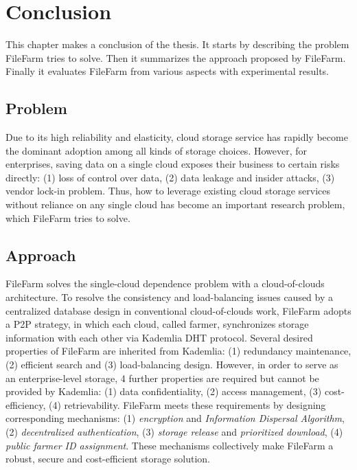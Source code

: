 \chapter{Conclusion}
\label{c:conclusion}

This chapter makes a conclusion of the thesis. It starts by describing the problem FileFarm tries to solve. Then it summarizes the approach proposed by FileFarm. Finally it evaluates FileFarm from various aspects with experimental results.

\section{Problem}
\label{s:conclusionproblem}

Due to its high reliability and elasticity, cloud storage service has rapidly become the dominant adoption among all kinds of storage choices. However, for enterprises, saving data on a single cloud exposes their business to certain risks directly: (1) loss of control over data, (2) data leakage and insider attacks, (3) vendor lock-in problem. Thus, how to leverage existing cloud storage services without reliance on any single cloud has become an important research problem, which FileFarm tries to solve.

\section{Approach}
\label{s:conclusionapproach}

FileFarm solves the single-cloud dependence problem with a cloud-of-clouds architecture. To resolve the consistency and load-balancing issues caused by a centralized database design in conventional cloud-of-clouds work, FileFarm adopts a P2P strategy, in which each cloud, called farmer, synchronizes storage information with each other via Kademlia DHT protocol. Several desired properties of FileFarm are inherited from Kademlia: (1) redundancy maintenance, (2) efficient search and (3) load-balancing design. However, in order to serve as an enterprise-level storage, 4 further properties are required but cannot be provided by Kademlia: (1) data confidentiality, (2) access management, (3) cost-efficiency, (4) retrievability. FileFarm meets these requirements by designing corresponding mechanisms: (1) \textit{encryption} and \textit{Information Dispersal Algorithm}, (2) \textit{decentralized authentication}, (3) \textit{storage release} and \textit{prioritized download}, (4) \textit{public farmer ID assignment}. These mechanisms collectively make FileFarm a robust, secure and cost-efficient storage solution.

